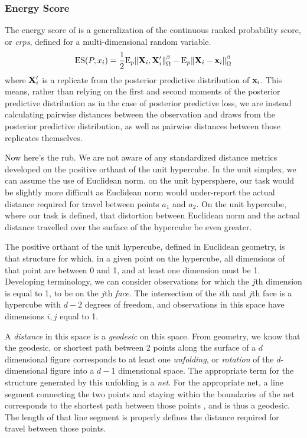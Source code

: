 \subsubsection{Energy Score}
The energy score of \cite{gneiting2007} is a generalization of the continuous ranked probability
  score, or \emph{crps}, defined for a multi-dimensional random variable.
  \begin{equation}
    \label{eq:es}
    \text{ES}(P,x_i) = \frac{1}{2}\text{E}_p\lVert {\bf X}_i,{\bf X}_i^{\prime}\rVert_{\Omega}^{\beta} -
                            \text{E}_p\lVert {\bf X}_i - {\bf x}_i\rVert_{\Omega}^{\beta}
  \end{equation}
  where ${\bf X}_i^{\prime}$ is a replicate from the posterior predictive distribution
  of ${\bf x}_i$. This means, rather than relying on the first and second moments of the posterior
  predictive distribution as in the case of posterior predictive loss\cite{gelfand1998}, we are
  instead calculating pairwise distances between the observation and draws from the posterior
  predictive distribution, as well as pairwise distances between those replicates themselves.

Now here's the rub.  We are not aware of any standardized distance metrics developed on the
  positive orthant of the unit hypercube.  In the unit simplex, we can assume the use of
  Euclidean norm.  on the unit hypersphere, our task would be slightly more difficult as
  Euclidean norm would under-report the actual distance required for travel between points $a_1$
  and $a_2$.  On the unit hypercube, where our task is defined, that distortion between Euclidean
  norm and the actual distance travelled over the surface of the hypercube be even greater.

The positive orthant of the unit hypercube, defined in Euclidean geometry, is that structure for
  which, in a given point on the hypercube, all dimensions of that point are between 0 and 1, and
  at least one dimension must be 1.  Developing terminology, we can consider observations for which
  the $j$th dimension is equal to 1, to be on the $j$th \emph{face}.  The intersection of the $i$th
  and $j$th face is a hypercube with $d-2$ degrees of freedom, and observations in this space have
  dimensions $i,j$ equal to 1.

A \emph{distance} in this space is a \emph{geodesic} on this space. From geometry, we know that 
  the geodesic, or shortest path between 2 points along the surface of a $d$ dimensional figure 
  corresponds to at least one \emph{unfolding}, or \emph{rotation} of the $d$-dimensional
  figure into a $d-1$ dimensional space.  The appropriate term for the structure generated by this
  unfolding is a \emph{net}.  For the appropriate net, a line segment connecting the two points and
  staying within the boundaries of the net corresponds to the shortest path between those points
  , and is thus a geodesic.  The length of that line segment is properly
  defines the distance required for travel between those points.

